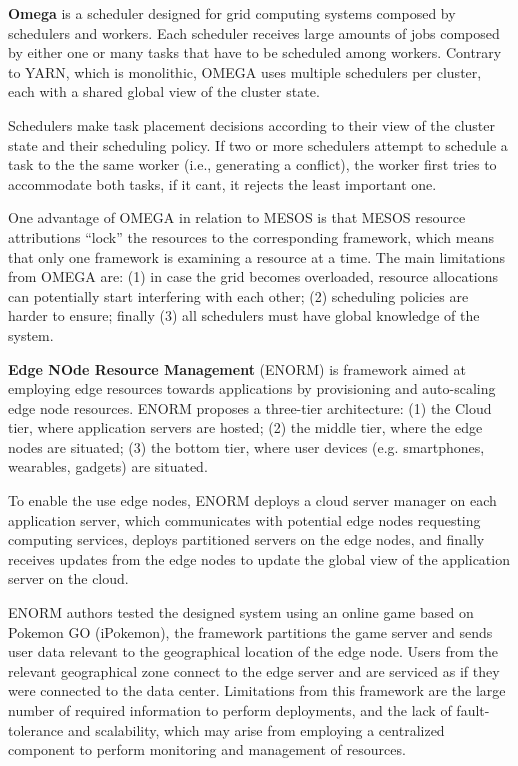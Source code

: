 \textbf{Omega} \cite{41684} is a scheduler designed for grid computing systems composed by schedulers and workers. Each scheduler receives large amounts of jobs composed by either one or many tasks that have to be scheduled among workers. Contrary to YARN, which is monolithic, OMEGA uses multiple schedulers per cluster, each with a shared global view of the cluster state.

Schedulers make task placement decisions according to their view of the cluster state and their scheduling policy. If two or more schedulers attempt to schedule a task to the the same worker (i.e., generating a conflict), the worker first tries to accommodate both tasks, if it cant, it rejects the least important one.

One advantage of OMEGA in relation to MESOS is that MESOS resource attributions ``lock'' the resources to the corresponding framework,  which means that only one framework is examining a resource at a time. The main limitations from OMEGA are: (1) in case the grid becomes overloaded, resource allocations can potentially start interfering with each other; (2) scheduling policies are harder to ensure; finally (3) all schedulers must have global knowledge of the system.

\textbf{Edge NOde Resource Management} \cite{wang2017enorm} (ENORM) is framework aimed at employing edge resources towards applications by provisioning and auto-scaling edge node resources. ENORM proposes a three-tier architecture: (1) the Cloud tier, where application servers are hosted; (2) the middle tier, where the edge nodes are situated; (3) the bottom tier, where user devices (e.g. smartphones, wearables, gadgets) are situated. 

To enable the use edge nodes, ENORM deploys a cloud server manager on each application server, which communicates with potential edge nodes requesting computing services, deploys partitioned servers on the edge nodes, and finally receives updates from the edge nodes to update the global view of the application server on the cloud.

ENORM authors tested the designed system using an online game based on Pokemon GO (iPokemon)\cite{pokemonGo}, the framework partitions the game server and sends user data relevant to the geographical location of the edge node. Users from the relevant geographical zone connect to the edge server and are serviced as if they were connected to the data center. Limitations from this framework are the large number of required information to perform deployments, and the lack of fault-tolerance and scalability, which may arise from employing a centralized component to perform monitoring and management of resources. 

